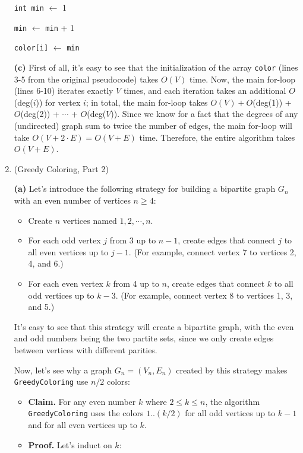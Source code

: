 \documentclass{article}
\begin{document}
\begin{enumerate}
\begin{center}
\begin{minipage}{0.5625\linewidth}
\begin{algorithm}[H]
{            {\tt int min} $\gets$ 1

            {
              {\tt min} $\gets$ {\tt min} + 1
            }

            {\tt color[i]} $\gets$ {\tt min}
          }

        \end{algorithm}
      \end{minipage}
    \end{center}

    \textbf{(c)} First of all, it's easy to see that the initialization of the array \texttt{color} (lines 3-5 from the original pseudocode) takes $O(V)$ time. Now, the main for-loop (lines 6-10) iterates exactly $V$ times, and each iteration takes an additional $O$(deg($i$)) for vertex $i$; in total, the main for-loop takes $O(V) + O$(deg(1)) + $O$(deg(2)) + $\cdots$ + $O$(deg($V$)). Since we know for a fact that the degrees of any (undirected) graph sum to twice the number of edges, the main for-loop will take $O(V + 2 \cdot E) = O(V + E)$ time. Therefore, the entire algorithm takes $O(V + E)$.

    \pagebreak

  \item (Greedy Coloring, Part 2)

    \textbf{(a)} Let's introduce the following strategy for building a bipartite graph $G_n$ with an even number of vertices $n \ge 4$:
    \begin{itemize}
      \item Create $n$ vertices named $1, 2, \cdots, n$.
      \item For each odd vertex $j$ from 3 up to $n - 1$, create edges that connect $j$ to all even vertices up to $j - 1$. (For example, connect vertex 7 to vertices 2, 4, and 6.)
      \item For each even vertex $k$ from 4 up to $n$, create edges that connect $k$ to all odd vertices up to $k - 3$. (For example, connect vertex 8 to vertices 1, 3, and 5.)
    \end{itemize}
    It's easy to see that this strategy will create a bipartite graph, with the even and odd numbers being the two partite sets, since we only create edges between vertices with different parities.

    Now, let's see why a graph $G_n = (V_n, E_n)$ created by this strategy makes \texttt{GreedyColoring} use $n/2$ colors:
    \begin{itemize}
      \item \textbf{Claim.} For any even number $k$ where $2 \le k \le n$, the algorithm \texttt{GreedyColoring} uses the colors $1..(k/2)$ for all odd vertices up to $k-1$ and for all even vertices up to $k$.
      \item \textbf{Proof.} Let's induct on $k$:


\end{itemize}
\end{enumerate}
\end{document}
